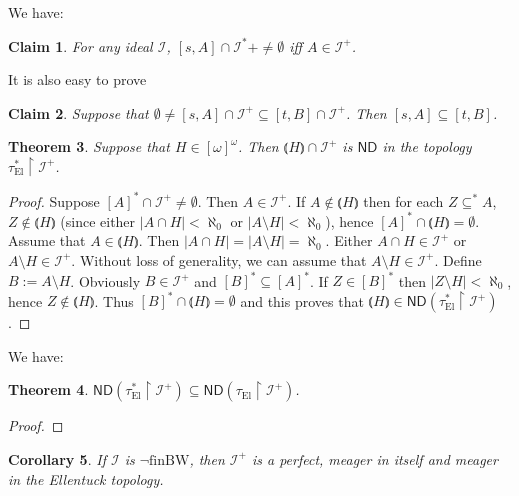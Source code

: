 \documentclass[12pt]{amsart}
\theoremstyle{plain}
\newtheorem{theorem}{Theorem}[section]
\newtheorem{corollary}[theorem]{Corollary}
\newtheorem{claim}[theorem]{Claim}
\theoremstyle{definition}
\theoremstyle{remark}
\newcommand{\infsub}{[\omega]^{\omega}}
\newcommand{\ND}{\mathsf{ND}}
\newcommand{\calI}{\mathcal{I}}
\newcommand{\EllentuckTopology}{\tau_\mathrm{El}}
\newcommand{\EllentuckTopologyStar}{\EllentuckTopology^*}
\newcommand{\lNawiasik}{\lParen}
\newcommand{\rNawiasik}{\rParen}
\newcommand{\notfinBW}{\neg \mathrm{finBW}}
\begin{document}
We have:

\begin{claim}
  For any ideal $\calI$, $[s, A]\cap \calI^* + \not= \emptyset$
iff $A\in\calI^+$.
\end{claim}

It is also easy to prove
\begin{claim}
  Suppose that $\emptyset \not= [s,A] \cap \calI^+ \subseteq [t,B] \cap \calI^+$.
  Then $[s,A] \subseteq [t,B]$.
\end{claim}


\begin{theorem}
  Suppose that $H \in \infsub$. Then
  $\lNawiasik H \rNawiasik \cap\calI^+$ is $\ND$ in the topology
  $\EllentuckTopologyStar\restriction\calI^+$.
\end{theorem}

\begin{proof}
  Suppose $[A]^*\cap\calI^+\not=\emptyset$.
Then $A\in \calI^+$. If $A\not\in \lNawiasik H \rNawiasik$
then for each $Z\subseteq^* A$, $Z \not\in \lNawiasik H \rNawiasik$
(since either $|A \cap H| < \aleph_0$ or $|A\setminus H| < \aleph_0$),
hence $[A]^* \cap  \lNawiasik H \rNawiasik = \emptyset$.
Assume that $A\in  \lNawiasik H \rNawiasik$. Then
$|A \cap H| = |A\setminus H| = \aleph_0$. Either
$A \cap H \in \calI^+$ or
$A \setminus H \in \calI^+$. Without loss of generality,
we can assume that $A\setminus H\in\calI^+$.
Define $B:= A\setminus H$. Obviously $B\in\calI^+$
and $[B]^*\subseteq [A]^*$. If $Z\in [B]^*$ then
$|Z \setminus H| < \aleph_0$, hence
$Z\not\in\lNawiasik H \rNawiasik$.
Thus $[B]^* \cap \lNawiasik H \rNawiasik = \emptyset$
and this proves that
$\lNawiasik H \rNawiasik \in \ND(\EllentuckTopologyStar\restriction\calI^+)$.
\end{proof}

We have:
\begin{theorem}
  $\ND(\EllentuckTopologyStar\restriction\calI^+) \subseteq
   \ND(\EllentuckTopology\restriction\calI^+)$.
\end{theorem}
\begin{proof}
\end{proof}

\begin{corollary}
  If $\calI$ is $\notfinBW$, then
$\calI^+$ is a perfect, meager in itself and meager
in the Ellentuck topology. 
\end{corollary}
\end{document}
